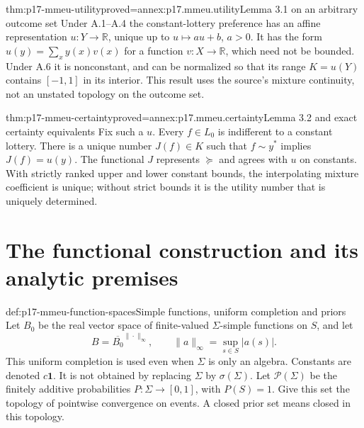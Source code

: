 \begin{hbtheorem}{thm:p17-mmeu-utility}{proved=annex:p17.mmeu.utility}{Lemma 3.1 on an arbitrary outcome set}
Under A.1--A.4 the constant-lottery preference has an affine
representation \(u:Y\to\mathbb R\), unique up to
\(u\mapsto au+b\), \(a>0\).
It has the form \(u(y)=\sum_x y(x)v(x)\) for a function
\(v:X\to\mathbb R\), which need not be bounded.
Under A.6 it is nonconstant, and can be normalized so that
its range \(K=u(Y)\) contains \([-1,1]\) in its interior.
This result uses the source's mixture continuity, not an
unstated topology on the outcome set.
\end{hbtheorem}

\begin{hbtheorem}{thm:p17-mmeu-certainty}{proved=annex:p17.mmeu.certainty}{Lemma 3.2 and exact certainty equivalents}
Fix such a \(u\). Every \(f\in L_0\) is indifferent to a
constant lottery. There is a unique number \(J(f)\in K\)
such that \(f\sim y^*\) implies \(J(f)=u(y)\).
The functional \(J\) represents \(\succeq\) and agrees with
\(u\) on constants. With strictly ranked upper and lower
constant bounds, the interpolating mixture coefficient is
unique; without strict bounds it is the utility number
that is uniquely determined.
\end{hbtheorem}

\section{The functional construction and its analytic premises}

\begin{hbdefinition}{def:p17-mmeu-function-spaces}{Simple functions, uniform completion and priors}
Let \(B_0\) be the real vector space of finite-valued
\(\Sigma\)-simple functions on \(S\), and let
\[
                     B=\overline{B_0}^{\|\cdot\|_\infty},
                \qquad \|a\|_\infty=\sup_{s\in S}|a(s)|.
\]
This uniform completion is used even when \(\Sigma\) is
only an algebra. Constants are denoted \(c\mathbf1\).
It is not obtained by replacing \(\Sigma\) by
\(\sigma(\Sigma)\).
Let \(\mathcal P(\Sigma)\) be the finitely additive
probabilities \(P:\Sigma\to[0,1]\), with \(P(S)=1\).
Give this set the topology of pointwise convergence on
events. A closed prior set means closed in this topology.
\end{hbdefinition}


